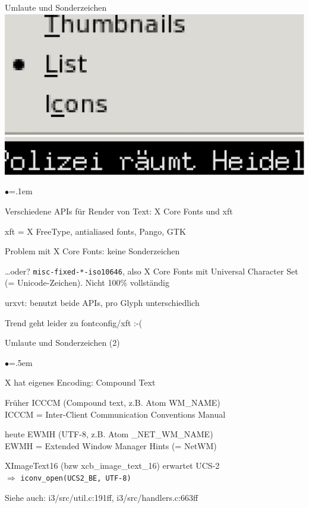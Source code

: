 \documentclass[mode=print,paper=screen,style=jefka]{powerdot}
\newcommand{\isrc}[1]{\begin{center} \footnotesize\ttfamily Siehe auch: #1 \end{center}}
\begin{document}
\begin{slide}[method=direct]{Umlaute und Sonderzeichen}
\includegraphics[width=.5\textwidth]{xft.eps}
\begin{list}{$\bullet$}{\itemsep=.1em}
	\item Verschiedene APIs für Render von Text: X Core Fonts und xft
	\item xft = X FreeType, antialiased fonts, Pango, GTK
	\item Problem mit X Core Fonts: keine Sonderzeichen
	\item …oder? \texttt{misc-fixed-*-iso10646}, also X Core Fonts mit Universal Character Set (= Unicode-Zeichen). Nicht 100\% vollständig
	\item urxvt: benutzt beide APIs, pro Glyph unterschiedlich
	\item Trend geht leider zu fontconfig/xft :-(
\end{list}
\end{slide}

\begin{slide}[method=direct]{Umlaute und Sonderzeichen (2)}
\begin{list}{$\bullet$}{\itemsep=.5em}
	\item X hat eigenes Encoding: Compound Text
	\item Früher ICCCM (Compound text, z.B. Atom WM\_NAME)\\
	ICCCM = Inter-Client Communication Conventions Manual
	\item heute EWMH (UTF-8, z.B. Atom \_NET\_WM\_NAME)\\
	EWMH = Extended Window Manager Hints (= NetWM)
	\item XImageText16 (bzw xcb\_image\_text\_16) erwartet UCS-2\\
	$\Rightarrow$ \texttt{iconv\_open(UCS2\_BE, UTF-8)}
\end{list}
\isrc{i3/src/util.c:191ff, i3/src/handlers.c:663ff}
\end{slide}
\end{document}
